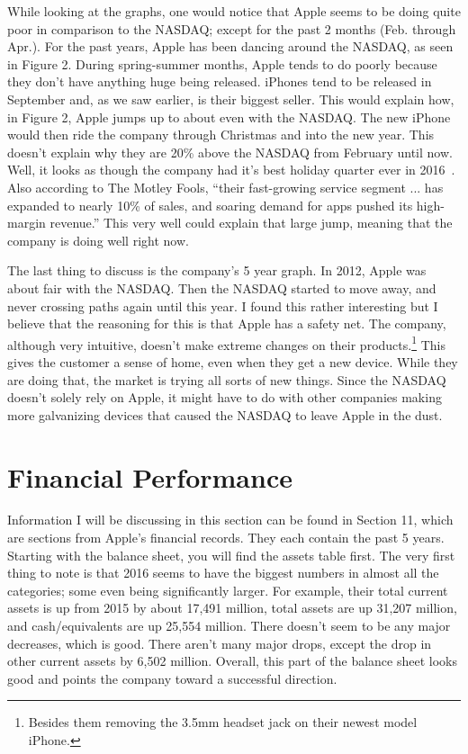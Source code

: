 \documentclass[12pt,a4paper,titlepage]{article}
\begin{document}
While looking at the graphs, one would notice that Apple seems to be doing quite
poor in comparison to the NASDAQ; except for the past 2 months (Feb. through
Apr.). For the past years, Apple has been dancing around the NASDAQ, as seen in
Figure 2. During spring-summer months, Apple tends to do poorly because they
don't have anything huge being released. iPhones tend to be released in
September and, as we saw earlier, is their biggest seller. This would explain
how, in Figure 2, Apple jumps up to about even with the NASDAQ. The new iPhone
would then ride the company through Christmas and into the new year. This
doesn't explain why they are 20\% above the NASDAQ from February until
now. Well, it looks as though the company had it's best holiday quarter ever in
2016~\cite{fool}. Also according to The Motley Fools, ``their fast-growing
service segment ... has expanded to nearly 10\% of sales, and soaring demand for
apps pushed its high-margin revenue.'' This very well could explain that large
jump, meaning that the company is doing well right now.

The last thing to discuss is the company's 5 year graph. In 2012, Apple was
about fair with the NASDAQ. Then the NASDAQ started to move away, and never
crossing paths again until this year. I found this rather interesting but I
believe that the reasoning for this is that Apple has a safety net. The company,
although very intuitive, doesn't make extreme changes on their
products.\footnote{Besides them removing the 3.5mm headset jack on their newest
  model iPhone.} This gives the customer a sense of home, even when they get a
new device. While they are doing that, the market is trying all sorts of new
things. Since the NASDAQ doesn't solely rely on Apple, it might have to do with
other companies making more galvanizing devices that caused the NASDAQ to leave
Apple in the dust.

\section{Financial Performance}
Information I will be discussing in this section can be found in Section 11,
which are sections from Apple's financial records. They each contain the past 5
years. Starting with the balance sheet, you will find the assets table
first. The very first thing to note is that 2016 seems to have the biggest
numbers in almost all the categories; some even being significantly larger. For
example, their total current assets is up from 2015 by about 17,491 million,
total assets are up 31,207 million, and cash/equivalents are up 25,554
million. There doesn't seem to be any major decreases, which is good. There
aren't many major drops, except the drop in other current assets by 6,502
million. Overall, this part of the balance sheet looks good and points the
company toward a successful direction.
\end{document}
